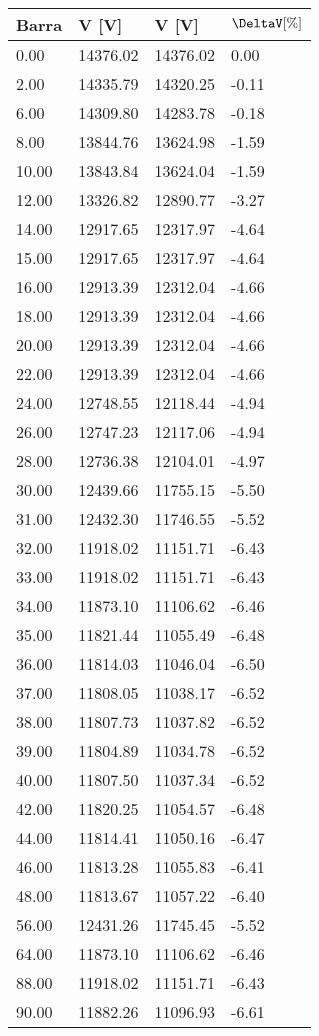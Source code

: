 \begin{tabular}{llll}
\toprule
\textbf{Barra}&\textbf{V [V]}&\textbf{V [V]}&\textbf{$\mathbf{\DeltaV [\%]}$}\\
\midrule
0.00&14376.02&14376.02&0.00\\
2.00&14335.79&14320.25&-0.11\\
6.00&14309.80&14283.78&-0.18\\
8.00&13844.76&13624.98&-1.59\\
10.00&13843.84&13624.04&-1.59\\
12.00&13326.82&12890.77&-3.27\\
14.00&12917.65&12317.97&-4.64\\
15.00&12917.65&12317.97&-4.64\\
16.00&12913.39&12312.04&-4.66\\
18.00&12913.39&12312.04&-4.66\\
20.00&12913.39&12312.04&-4.66\\
22.00&12913.39&12312.04&-4.66\\
24.00&12748.55&12118.44&-4.94\\
26.00&12747.23&12117.06&-4.94\\
28.00&12736.38&12104.01&-4.97\\
30.00&12439.66&11755.15&-5.50\\
31.00&12432.30&11746.55&-5.52\\
32.00&11918.02&11151.71&-6.43\\
33.00&11918.02&11151.71&-6.43\\
34.00&11873.10&11106.62&-6.46\\
35.00&11821.44&11055.49&-6.48\\
36.00&11814.03&11046.04&-6.50\\
37.00&11808.05&11038.17&-6.52\\
38.00&11807.73&11037.82&-6.52\\
39.00&11804.89&11034.78&-6.52\\
40.00&11807.50&11037.34&-6.52\\
42.00&11820.25&11054.57&-6.48\\
44.00&11814.41&11050.16&-6.47\\
46.00&11813.28&11055.83&-6.41\\
48.00&11813.67&11057.22&-6.40\\
56.00&12431.26&11745.45&-5.52\\
64.00&11873.10&11106.62&-6.46\\
88.00&11918.02&11151.71&-6.43\\
90.00&11882.26&11096.93&-6.61\\
\bottomrule
\end{tabular}

